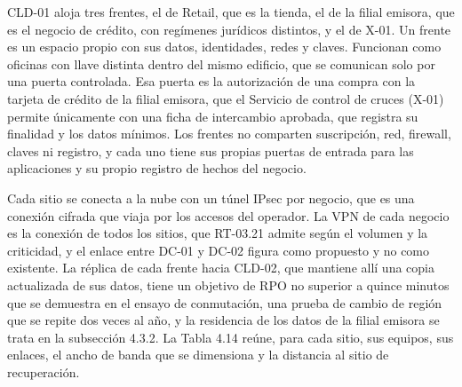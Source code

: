 \documentclass[11pt]{article}
\begin{document}
CLD-01 aloja tres frentes, el de Retail, que es la tienda, el de la filial emisora, que es el negocio de crédito, con regímenes jurídicos distintos, y el de X-01. Un frente es un espacio propio con sus datos, identidades, redes y claves. Funcionan como oficinas con llave distinta dentro del mismo edificio, que se comunican solo por una puerta controlada. Esa puerta es la autorización de una compra con la tarjeta de crédito de la filial emisora, que el Servicio de control de cruces (X-01) permite únicamente con una ficha de intercambio aprobada, que registra su finalidad y los datos mínimos. Los frentes no comparten suscripción, red, firewall, claves ni registro, y cada uno tiene sus propias puertas de entrada para las aplicaciones y su propio registro de hechos del negocio.

Cada sitio se conecta a la nube con un túnel IPsec por negocio, que es una conexión cifrada que viaja por los accesos del operador. La VPN de cada negocio es la conexión de todos los sitios, que RT-03.21 admite según el volumen y la criticidad, y el enlace entre DC-01 y DC-02 figura como propuesto y no como existente. La réplica de cada frente hacia CLD-02, que mantiene allí una copia actualizada de sus datos, tiene un objetivo de RPO no superior a quince minutos que se demuestra en el ensayo de conmutación, una prueba de cambio de región que se repite dos veces al año, y la residencia de los datos de la filial emisora se trata en la subsección 4.3.2. La Tabla 4.14 reúne, para cada sitio, sus equipos, sus enlaces, el ancho de banda que se dimensiona y la distancia al sitio de recuperación.

\par\vspace{0pt plus 10\baselineskip}\vspace{0pt plus -10\baselineskip}
\end{document}
